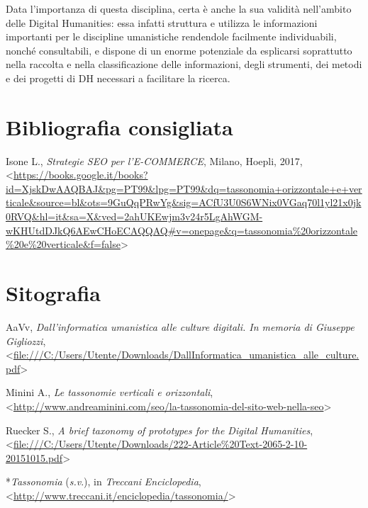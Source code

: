 \documentclass[
  b5paper,
  twoside,
  11pt,
  chapterprefix=false,
  bibliography=totocnumbered,
  listof=flat]{scrbook}
\begin{document}
Data l'importanza di questa disciplina, certa è anche la sua validità
nell'ambito delle Digital Humanities: essa infatti struttura e utilizza
le informazioni importanti per le discipline umanistiche rendendole
facilmente individuabili, nonché consultabili, e dispone di un enorme
potenziale da esplicarsi soprattutto nella raccolta e nella
classificazione delle informazioni, degli strumenti, dei metodi e dei
progetti di DH necessari a facilitare la ricerca.

\hypertarget{bibliografia-consigliata-23}{%
\section*{Bibliografia consigliata}\label{bibliografia-consigliata-23}}

Isone L., \emph{Strategie SEO per l'E-COMMERCE}, Milano, Hoepli, 2017,
\textless{}{\url{https://books.google.it/books?id=XjskDwAAQBAJ\&pg=PT99\&lpg=PT99\&dq=tassonomia+orizzontale+e+verticale\&source=bl\&ots=9GuQqPRwYg\&sig=ACfU3U0S6WNix0VGaq70l1yl21x0jk0RVQ\&hl=it\&sa=X\&ved=2ahUKEwjm3v24r5LgAhWGM-wKHUtdDJkQ6AEwCHoECAQQAQ\#v=onepage\&q=tassonomia\%20orizzontale\%20e\%20verticale\&f=false}\textgreater{}}

\hypertarget{sitografia-27}{%
\section*{Sitografia}\label{sitografia-27}}

AaVv, \emph{Dall'informatica umanistica alle culture digitali. In memoria di
Giuseppe Gigliozzi},
\textless{}{\url{file:///C:/Users/Utente/Downloads/DallInformatica_umanistica_alle_culture.pdf}\textgreater{}}

Minini A., \emph{Le tassonomie verticali e orizzontali},
\textless{}{\url{http://www.andreaminini.com/seo/la-tassonomia-del-sito-web-nella-seo}\textgreater{}}

Ruecker S., \emph{A brief taxonomy of prototypes for the Digital Humanities},
\textless{}{\href{file:///C:/Users/Utente/Downloads/222-Article\%20Text-2065-2-10-20151015.pdf}{file:///C:/Users/Utente/Downloads/222-Article\%20Text-2065-2-10-20151015.pdf}\textgreater{}}

*\emph{Tassonomia} (\emph{s.v}.), in \emph{Treccani} \emph{Enciclopedia},
\textless{}\href{http://www.treccani.it/enciclopedia/tassonomia/}{{http://www.treccani.it/enciclopedia/tassonomia/}}\textgreater{}
\end{document}
